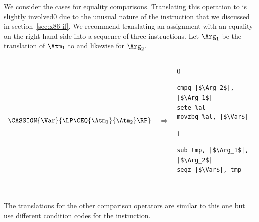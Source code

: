 \documentclass[7x10]{TimesAPriori_MIT}%
\def\xeightysixEd{0}
\def\riscvEd{1}
\def\architecture{1}
\newcommand\ifxeightsix[1]{\if\architecture\xeightysixEd{#1}\fi}
\numberwithin{theorem}{chapter}
\numberwithin{definition}{chapter}
\numberwithin{equation}{chapter}
\begin{document}
We consider the cases for equality comparisons.  Translating this
operation to {\ArchName} is slightly involved\ifxeightsix{ due to the unusual nature of the
 instruction that we discussed in section~\ref{sec:x86-if}}.
We recommend translating an assignment with an equality on the
right-hand side into a sequence of three instructions. Let $\Arg_1$
be the translation of $\Atm_1$ to {\ArchName} and likewise for $\Arg_2$.\\
\begin{tabular}{lll}
\begin{minipage}{0.4\textwidth}
$\CASSIGN{\Var}{ \LP\CEQ{\Atm_1}{\Atm_2} \RP }$ 
\end{minipage}
&
$\Rightarrow$
&
\begin{minipage}{0.4\textwidth}
\if\architecture\xeightysixEd
\begin{lstlisting}
cmpq |$\Arg_2$|, |$\Arg_1$|
sete %al
movzbq %al, |$\Var$|
\end{lstlisting}
\fi
\if\architecture\riscvEd
\begin{lstlisting}
sub tmp, |$\Arg_1$|, |$\Arg_2$|
seqz |$\Var$|, tmp
\end{lstlisting}
\fi
\end{minipage}
\end{tabular}  \\
The translations for the other comparison operators are similar to
this one but use different condition codes for the  instruction.
\end{document}
